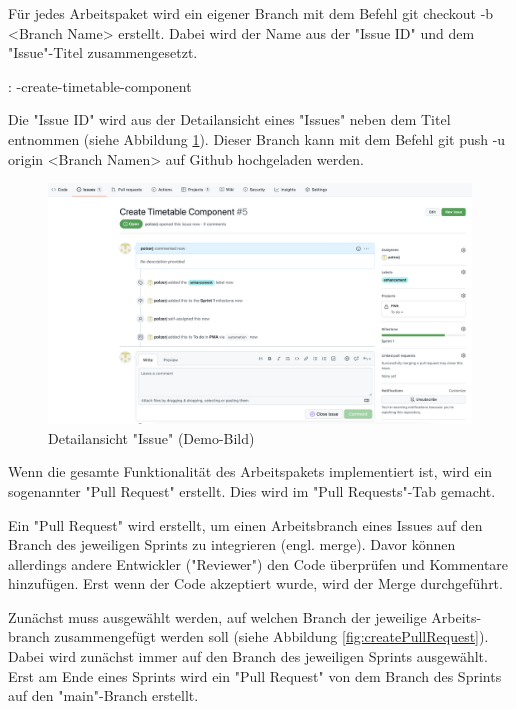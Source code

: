 Für jedes Arbeitspaket wird ein eigener Branch mit dem Befehl {\ttfamily git checkout -b <Branch Name>} erstellt. Dabei wird der Name aus der "Issue ID" und dem "Issue"-Titel zusammengesetzt. 

\zb:
{-create-timetable-component}

Die "Issue ID" wird aus der Detailansicht eines "Issues" neben dem Titel entnommen (siehe Abbildung \ref{fig:issueInfo}). Dieser Branch kann mit dem Befehl {\ttfamily git push -u origin <Branch Namen>} auf Github hochgeladen werden. 

\begin{figure}[H]
    \centering
    \includegraphics[width=\textwidth]{media/ProjectManagement/IssueInfo.png}
    \caption{Detailansicht "Issue" (Demo-Bild)}
    \label{fig:issueInfo}
\end{figure}


Wenn die gesamte Funktionalität des Arbeitspakets implementiert ist, wird ein sogenannter "Pull Request" erstellt. Dies wird im "Pull Requests"-Tab gemacht. 

Ein "Pull Request" wird erstellt, um einen Arbeitsbranch eines Issues auf den Branch des jeweiligen Sprints zu integrieren (engl. merge). Davor können allerdings andere Entwickler ("Reviewer") den Code überprüfen und Kommentare hinzufügen. Erst wenn der Code akzeptiert wurde, wird der Merge durchgeführt.

Zunächst muss ausgewählt werden, auf welchen Branch der jeweilige Arbeits-branch zusammengefügt werden soll (siehe Abbildung \ref{fig:createPullRequest}). Dabei wird zunächst immer auf den Branch des jeweiligen Sprints ausgewählt. Erst am Ende eines Sprints wird ein "Pull Request" von dem Branch des Sprints auf den "main"-Branch erstellt.

